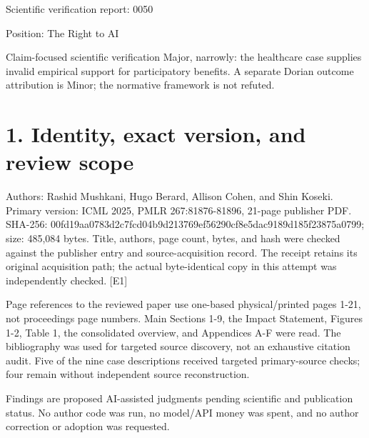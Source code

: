 \documentclass[10pt]{article}
\begin{document}
Scientific verification report: 0050\par
Position: The Right to AI\par
Claim-focused scientific verification
Major, narrowly: the healthcare case supplies invalid empirical support for participatory benefits. A separate Dorian outcome attribution is Minor; the normative framework is not refuted.\par
\section*{1. Identity, exact version, and review scope}
Authors: Rashid Mushkani, Hugo Berard, Allison Cohen, and Shin Koseki. Primary version: ICML 2025, PMLR 267:81876-81896, 21-page publisher PDF. SHA-256: 00fd19aa0783d2c7fcd04b9d213769ef56290cf8e5dac9189d185f23875a0799; size: 485,084 bytes. Title, authors, page count, bytes, and hash were checked against the publisher entry and source-acquisition record. The receipt retains its original acquisition path; the actual byte-identical copy in this attempt was independently checked. [E1]\par
Page references to the reviewed paper use one-based physical/printed pages 1-21, not proceedings page numbers. Main Sections 1-9, the Impact Statement, Figures 1-2, Table 1, the consolidated overview, and Appendices A-F were read. The bibliography was used for targeted source discovery, not an exhaustive citation audit. Five of the nine case descriptions received targeted primary-source checks; four remain without independent source reconstruction.\par
Findings are proposed AI-assisted judgments pending scientific and publication status. No author code was run, no model/API money was spent, and no author correction or adoption was requested.\par
\end{document}
